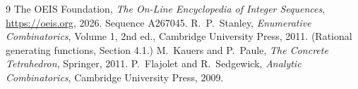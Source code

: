 \documentclass[11pt,a4paper]{article}
\theoremstyle{plain}
\theoremstyle{definition}
\begin{document}
\begin{thebibliography}{9}
 The OEIS Foundation, \emph{The On-Line Encyclopedia of Integer
Sequences}, \url{https://oeis.org}, 2026. Sequence A267045.
 R.~P.~Stanley, \emph{Enumerative Combinatorics}, Volume 1, 2nd ed.,
Cambridge University Press, 2011. (Rational generating functions, Section 4.1.)
 M.~Kauers and P.~Paule, \emph{The Concrete Tetrahedron}, Springer, 2011.
 P.~Flajolet and R.~Sedgewick, \emph{Analytic Combinatorics}, Cambridge
University Press, 2009.
\end{thebibliography}
\end{document}
